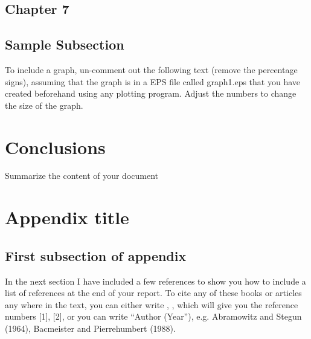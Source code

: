 \documentclass[12pt]{article}
\theoremstyle{definition}
\numberwithin{equation}{section}
\begin{document}
{\subsection{Chapter 7}





\subsection{Sample Subsection}
To include a graph, un-comment out the following text (remove the percentage signs), assuming that the graph is in a EPS file called graph1.eps that you have created beforehand using any plotting program. Adjust the numbers to change the size of the graph.




\section{Conclusions}

Summarize the content of your document

\appendix

\section{Appendix title}

\subsection{First subsection of appendix }

In the next section I have included a few references to show you how to include a list of references at the end of your report. To cite any of these books or articles any where in the text, you can either write \cite{Knobel}, \cite{Okamoto}, which will give you the reference numbers [1], [2], or you can write ``Author (Year''), e.g. Abramowitz and Stegun (1964), Bacmeister and Pierrehumbert (1988).

}
\end{document}
